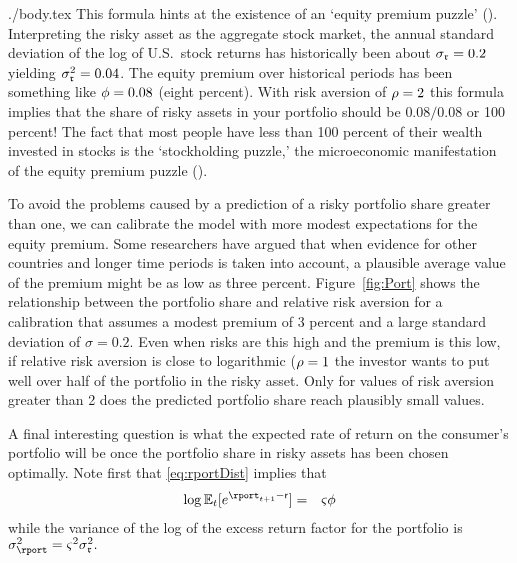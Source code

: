 \documentclass{bejournal}
\begin{document}
\begin{verbatimwrite}{./body.tex}
This formula hints at the existence of an `equity premium puzzle'
(\cite{mehra&prescott:puzzle}).  Interpreting the risky asset as the
aggregate stock market, the annual standard deviation of the log of
U.S.\ stock returns has historically been about $\sigma_{\mathfrak{r}}=0.2$
yielding $\sigma_{\mathfrak{r}}^{2} = 0.04$.  The equity premium over historical periods
has been something like $\phi = 0.08$ (eight percent).  With risk
aversion of $\rho=2$ this formula implies that the share of risky
assets in your portfolio should be $0.08/0.08$ or 100 percent!  The
fact that most people have less than 100 percent of their wealth
invested in stocks is the `stockholding puzzle,' the microeconomic
manifestation of the equity premium puzzle
(\cite{haliassos&bertaut:fewholdstocks}).

To avoid the problems caused by a prediction of a risky portfolio
share greater than one, we can calibrate the model with more modest
expectations for the equity premium.  Some researchers have argued
that when evidence for other countries and longer time periods is
taken into account, a plausible average value of the premium might be
as low as three percent.  Figure~\ref{fig:Port} shows the relationship
between the portfolio share and relative risk aversion for a
calibration that assumes a modest premium of 3 percent and a large
standard deviation of $\sigma=0.2$.  Even when risks are this high and
the premium is this low, if relative risk aversion is close to
logarithmic ($\rho = 1$ the investor wants to put well over half of
the portfolio in the risky asset.  Only for values of risk aversion
greater than 2 does the predicted portfolio share reach plausibly
small values.



A final interesting question is what the expected rate of return on
the consumer's portfolio will be once the portfolio share in risky
assets has been chosen optimally.  Note first that \eqref{eq:rportDist}
implies that 
\begin{eqnarray}
  \log \Ex_{t}[e^{\rport_{t+1}-\rfree}] & = & \riskyshare \eprem  \label{eq:eport}
\end{eqnarray}
while the variance of the log of the excess return factor for the portfolio is $\sigma^{2}_{\rport} = \riskyshare^{2} \sigma^{2}_{\risky}.$


\end{verbatimwrite}
\end{document}
